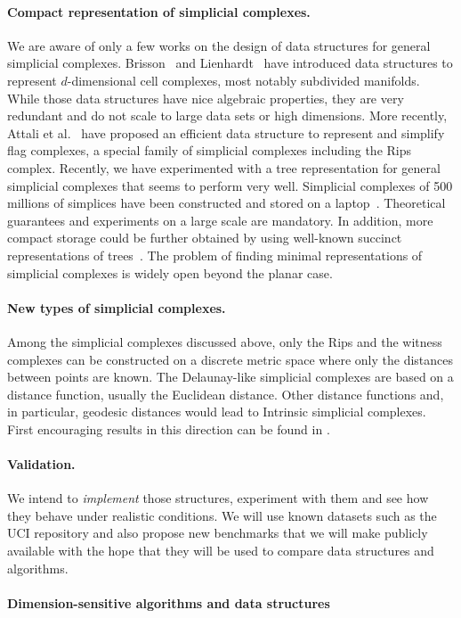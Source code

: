 \paragraph{Compact representation of simplicial complexes.} We are aware of only a few works on the design of data structures for general simplicial complexes. Brisson~\cite{Brisson:1989:RGS:73833.73858} and Lienhardt~\cite{DBLP:journals/ijcga/Lienhardt94} have introduced data structures to represent $d$-dimensional cell complexes, most notably subdivided manifolds. While those data structures have nice algebraic properties, they are very redundant and do not scale to large data sets or high dimensions. More recently, Attali et al.~\cite{Attali2011} have proposed an efficient data structure to represent and simplify flag complexes, a special family of simplicial complexes including the Rips complex. 
Recently, we have experimented with a tree representation for general simplicial
complexes that seems to perform very well. Simplicial complexes of 500 millions of simplices have been constructed and stored on a laptop~\cite{}. 
Theoretical guarantees and experiments on a large scale are mandatory. In
addition, more compact storage could be further obtained by using
well-known succinct representations of trees~\cite{10.1109/SFCS.1989.63533,Munro:2002:SRB:586840.586885,Ferragina:2005:SLT:1097112.1097456,DBLP:conf/icalp/2003}. The problem of finding minimal representations of simplicial complexes is widely open beyond the planar case.


\paragraph{New types of simplicial complexes.}
Among the simplicial complexes discussed above, only the Rips and the witness complexes can be constructed on a discrete metric space where only the distances between points are known. The Delaunay-like simplicial complexes are based on a distance function, usually the Euclidean distance.  Other distance functions and, in particular, geodesic distances would lead to Intrinsic simplicial complexes. First encouraging results in this direction can be found in \cite{}.


\paragraph{Validation.} 
We intend to {\em implement} those structures, experiment with them and see how they behave under realistic conditions. We will use known datasets such as the UCI repository \cite{} and also propose new benchmarks that we will make publicly available with the hope that they will be used to compare data structures and algorithms.

\paragraph{Dimension-sensitive algorithms and data structures} 







